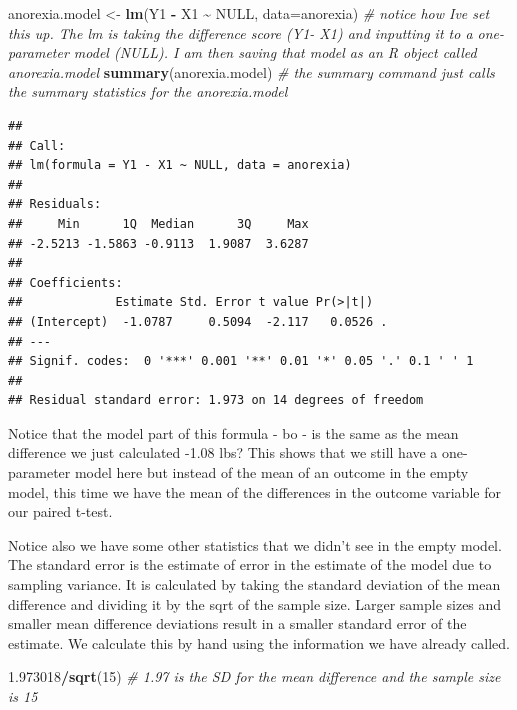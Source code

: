 \documentclass[
]{article}
\newenvironment{Shaded}{\begin{snugshade}}{\end{snugshade}}
\newcommand{\AttributeTok}[1]{\textcolor[rgb]{0.13,0.29,0.53}{#1}}
\newcommand{\CommentTok}[1]{\textcolor[rgb]{0.56,0.35,0.01}{\textit{#1}}}
\newcommand{\ConstantTok}[1]{\textcolor[rgb]{0.56,0.35,0.01}{#1}}
\newcommand{\DecValTok}[1]{\textcolor[rgb]{0.00,0.00,0.81}{#1}}
\newcommand{\FloatTok}[1]{\textcolor[rgb]{0.00,0.00,0.81}{#1}}
\newcommand{\FunctionTok}[1]{\textcolor[rgb]{0.13,0.29,0.53}{\textbf{#1}}}
\newcommand{\NormalTok}[1]{#1}
\newcommand{\OtherTok}[1]{\textcolor[rgb]{0.56,0.35,0.01}{#1}}
\newcommand{\SpecialCharTok}[1]{\textcolor[rgb]{0.81,0.36,0.00}{\textbf{#1}}}
\begin{document}
\begin{Shaded}
\begin{Highlighting}[]
\NormalTok{anorexia.model }\OtherTok{\textless{}{-}} \FunctionTok{lm}\NormalTok{(Y1 }\SpecialCharTok{{-}}\NormalTok{ X1 }\SpecialCharTok{\textasciitilde{}} \ConstantTok{NULL}\NormalTok{, }\AttributeTok{data=}\NormalTok{anorexia) }\CommentTok{\# notice how I\textquotesingle{}ve set this up. The lm is taking the difference score (Y1{-} X1) and inputting it to a one{-}parameter model (NULL). I am then saving that model as an R object called anorexia.model}
\FunctionTok{summary}\NormalTok{(anorexia.model) }\CommentTok{\# the summary command just calls the summary statistics for the anorexia.model}
\end{Highlighting}
\end{Shaded}

\begin{verbatim}
## 
## Call:
## lm(formula = Y1 - X1 ~ NULL, data = anorexia)
## 
## Residuals:
##     Min      1Q  Median      3Q     Max 
## -2.5213 -1.5863 -0.9113  1.9087  3.6287 
## 
## Coefficients:
##             Estimate Std. Error t value Pr(>|t|)  
## (Intercept)  -1.0787     0.5094  -2.117   0.0526 .
## ---
## Signif. codes:  0 '***' 0.001 '**' 0.01 '*' 0.05 '.' 0.1 ' ' 1
## 
## Residual standard error: 1.973 on 14 degrees of freedom
\end{verbatim}

Notice that the model part of this formula - bo - is the same as the
mean difference we just calculated -1.08 lbs? This shows that we still
have a one-parameter model here but instead of the mean of an outcome in
the empty model, this time we have the mean of the differences in the
outcome variable for our paired t-test.

Notice also we have some other statistics that we didn't see in the
empty model. The standard error is the estimate of error in the estimate
of the model due to sampling variance. It is calculated by taking the
standard deviation of the mean difference and dividing it by the sqrt of
the sample size. Larger sample sizes and smaller mean difference
deviations result in a smaller standard error of the estimate. We
calculate this by hand using the information we have already called.

\begin{Shaded}
\begin{Highlighting}[]
\FloatTok{1.973018}\SpecialCharTok{/}\FunctionTok{sqrt}\NormalTok{(}\DecValTok{15}\NormalTok{) }\CommentTok{\# 1.97 is the SD for the mean difference and the sample size is 15}
\end{Highlighting}
\end{Shaded}
\end{document}
